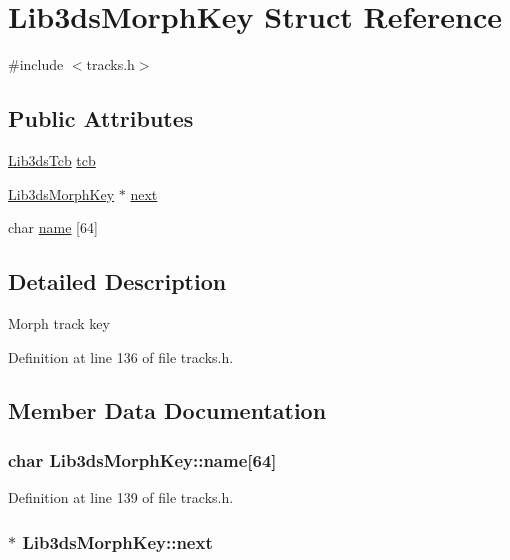 \hypertarget{struct_lib3ds_morph_key}{\section{Lib3ds\-Morph\-Key Struct Reference}
\label{struct_lib3ds_morph_key}
}


{\ttfamily \#include $<$tracks.\-h$>$}

\subsection*{Public Attributes}
\begin{DoxyCompactItemize}
\item 
\hyperlink{struct_lib3ds_tcb}{Lib3ds\-Tcb} \hyperlink{struct_lib3ds_morph_key_a5fb13734626612f3a63cada207efccff}{tcb}
\item 
\hyperlink{struct_lib3ds_morph_key}{Lib3ds\-Morph\-Key} $\ast$ \hyperlink{struct_lib3ds_morph_key_ab9addf0dc49b9cf62dcf9da7f20faed2}{next}
\item 
char \hyperlink{struct_lib3ds_morph_key_a67ce89b10fc79177e9913f4bceeacb65}{name} \mbox{[}64\mbox{]}
\end{DoxyCompactItemize}


\subsection{Detailed Description}
Morph track key 

Definition at line 136 of file tracks.\-h.



\subsection{Member Data Documentation}
\hypertarget{struct_lib3ds_morph_key_a67ce89b10fc79177e9913f4bceeacb65}{
\subsubsection[{name}]{\setlength{\rightskip}{0pt plus 5cm}char Lib3ds\-Morph\-Key\-::name\mbox{[}64\mbox{]}}}\label{struct_lib3ds_morph_key_a67ce89b10fc79177e9913f4bceeacb65}


Definition at line 139 of file tracks.\-h.

\hypertarget{struct_lib3ds_morph_key_ab9addf0dc49b9cf62dcf9da7f20faed2}{
\subsubsection[{next}]{$\ast$ Lib3ds\-Morph\-Key\-::next}}\label{struct_lib3ds_morph_key_ab9addf0dc49b9cf62dcf9da7f20faed2}


